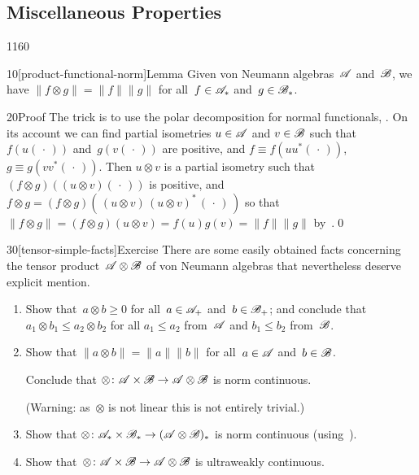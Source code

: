 \subsection{Miscellaneous Properties}
\begin{parsec}{1160}%
\begin{point}{10}[product-functional-norm]{Lemma}%
Given von Neumann algebras~$\mathscr{A}$ and~$\mathscr{B}$,
we have $\|f\otimes g\|=\|f\|\|g\|$
for all~$f\in\mathscr{A}_*$ and~$g\in\mathscr{B}_*$.%
\begin{point}{20}{Proof}%
The trick is to use the polar decomposition
for normal functionals, .
On its account we can find partial isometries $u\in\mathscr{A}$
and $v\in\mathscr{B}$
such that
$f(u(\,\cdot\,))$
and~$g(v(\,\cdot\,))$ are positive,
and
$f\equiv f(uu^*(\,\cdot\,))$,  $g\equiv g(vv^*(\,\cdot\,))$.
Then $u\otimes v$ is a partial isometry
such that $(f\otimes g)((u\otimes v)(\,\cdot\,))$
is positive,
and $f\otimes g
= (f\otimes g)(\,(u\otimes v)\, (u\otimes v)^*\,(\,\cdot\,)\,)$
so that $\|f\otimes g\|=(f\otimes g)(u\otimes v)
= f(u)g(v)=\|f\|\|g\|$ by~.\qed
\end{point}
\end{point}
\begin{point}{30}[tensor-simple-facts]{Exercise}%
There are some easily obtained facts
concerning the tensor product~$\mathscr{A}\otimes\mathscr{B}$
of von Neumann algebras
that nevertheless deserve explicit mention.
\begin{enumerate}
\item
Show that~$a\otimes b\geq 0$
for all~$a\in\mathscr{A}_+$ and~$b\in\mathscr{B}_+$;
and conclude that $a_1\otimes b_1 \leq a_2\otimes b_2$
for all
$a_1\leq a_2$ from~$\mathscr{A}$ and $b_1\leq b_2$ from~$\mathscr{B}$.
\item
Show that $\|a\otimes b\| = \|a\|\|b\|$
for all~$a\in\mathscr{A}$ and~$b\in\mathscr{B}$.

Conclude that $\otimes\colon \mathscr{A}\times\mathscr{B}\to\mathscr{A}\otimes \mathscr{B}$
is norm continuous.

(Warning: as~$\otimes$ is not linear
this is not entirely trivial.)
\item
Show that $\otimes\colon \mathscr{A}_*\times\mathscr{B}_*\to(\mathscr{A}\otimes\mathscr{B})_*$
is norm continuous
(using~).
\item
Show that~$\otimes\colon \mathscr{A}\times \mathscr{B}\to \mathscr{A}\otimes \mathscr{B}$
is ultraweakly continuous.


\end{enumerate}
\end{point}
\end{parsec}
